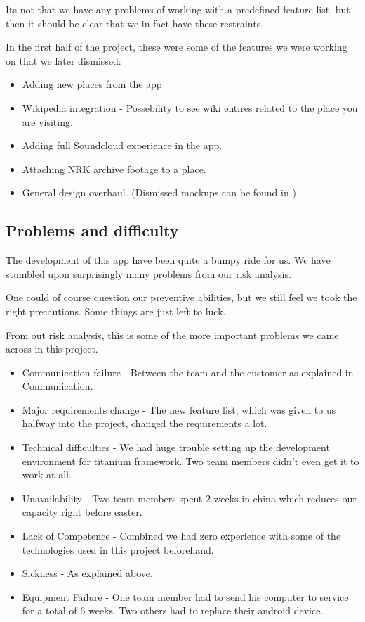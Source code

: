 Its not that we have any problems of working with a predefined feature list, but then it should be clear that we in fact have these restraints.

In the first half of the project, these were some of the features we were working on that we later dismissed:

\begin{itemize}
	\item Adding new places from the app
	\item Wikipedia integration - Possebility to see wiki entires related to the place you are visiting.
	\item Adding full Soundcloud experience in the app.
	\item Attaching NRK archive footage to a place. 
	\item General design overhaul.  (Dismissed mockups can be found in )
\end{itemize}

	\subsection{Problems and difficulty}

The development of this app have been quite a bumpy ride for us. We have stumbled upon surprisingly many problems from our risk analysis.

One could of course question our preventive abilities, but we still feel we took the right precautions. Some things are just left to luck.

From out risk analysis, this is some of the more important problems we came across in this project. 

\begin{itemize}
	\item Communication failure - Between the team and the customer as explained in Communication.
	\item Major requirements change - The new feature list, which was given to us halfway into the project, changed the requirements a lot.
	\item Technical difficulties - We had huge trouble setting up the development environment for titanium framework. Two team members didn't even get it to work at all.
	\item Unavailability - Two team members spent 2 weeks in china which reduces our capacity right before easter. 
	\item Lack of Competence - Combined we had zero experience with some of the technologies used in this project beforehand.
	\item Sickness - As explained above.
	\item Equipment Failure - One team member had to send his computer to service for a total of 6 weeks. Two others had to replace their android device. 
\end{itemize}

